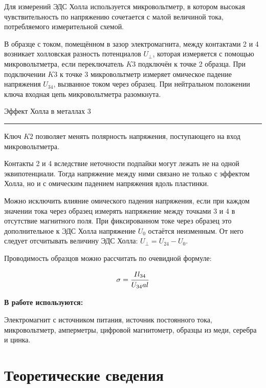 \documentclass[12pt,a4paper]{scrartcl}
\begin{document}
	Для измерений ЭДС Холла используется микровольтметр, в котором высокая чувствительность по напряжению сочетается с малой величиной тока, потребляемого измерительной схемой.
	
	В образце с током, помещённом в зазор электромагнита, между контактами 2 и 4 возникает холловская разность потенциалов $U_\perp$, которая измеряется с помощью микровольтметра, если переключатель $K3$ подключён к точке 2 образца. При подключении $K3$ к точке 3 микровольтметр измеряет омическое падение напряжения $U_{34}$, вызванное током через образец. При нейтральном положении ключа входная цепь микровольтметра разомкнута.	

	\newpage


	\begin{flushleft}
		\footnotesize{Эффект Холла в металлах} \hspace{\fill} \footnotesize{3}
		\\[-0.3cm]\noindent\rule{\textwidth}{0.3pt}
	\end{flushleft}		
		
	Ключ $K2$ позволяет менять полярность напряжения, поступающего на вход микровольтметра.	
		
	Контакты 2 и 4 вследствие неточности подпайки могут лежать не на одной эквипотенциали. Тогда напряжение между ними связано не только с эффектом Холла, но и с омическим падением напряжения вдоль пластинки.
	
	Можно исключить влияние омического падения напряжения, если при каждом значении тока через образец измерять на­пряжение между точками 3 и 4 в отсутствие магнитного поля. При фиксированном токе через образец это дополнительное к ЭДС Холла напряжение $U_0$ остаётся неизменным. От него следует отсчитывать величину ЭДС Холла:	$U_\perp = U_{24} - U_0$.
	
	Проводимость образцов можно рассчитать по очевидной формуле:
	
	$$\sigma = \dfrac{\strut Il_{34}}{\strut U_{34}al}$$
		
	\textbf{В работе используются:}
	
	Электромагнит с источником питания, источник постоянного тока, микровольтметр, амперметры, цифровой магнитометр, образцы из меди, серебра и цинка.
	
	\section{Теоретические сведения}
	
\end{document}
